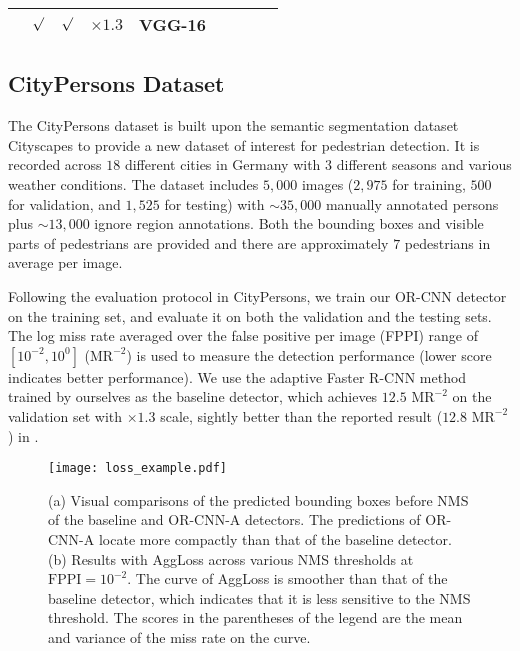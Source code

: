 \documentclass[runningheads]{llncs}
\begin{document}
\begin{table*}[t]
\begin{tabular}{c|cc|c|c|c|ccc}
&$\surd$ &$\surd$  &$\times1.3$ &VGG-16 &\color{red}{11.0} &\color{red}{51.3} &\color{red}{13.7} &\color{red}{5.9} \\
\bottomrule[1.5pt]
\end{tabular}
\label{tab:cityperson-val}
\end{table*}


\subsection{CityPersons Dataset}
The CityPersons dataset \cite{DBLP:conf/cvpr/ZhangBS17} is built upon the semantic segmentation dataset Cityscapes \cite{DBLP:conf/cvpr/CordtsORREBFRS16} to provide a new dataset of interest for pedestrian detection. It is recorded across $18$ different cities in Germany with $3$ different seasons and various weather conditions. The dataset includes $5,000$ images ($2,975$ for training, $500$ for validation, and $1,525$ for testing) with $\sim35,000$ manually annotated persons plus $\sim13,000$ ignore region annotations. Both the bounding boxes and visible parts of pedestrians are provided and there are approximately $7$ pedestrians in average per image.

Following the evaluation protocol in CityPersons, we train our OR-CNN detector on the training set, and evaluate it on both the validation and the testing sets. The log miss rate averaged over the false positive per image (FPPI) range of $[10^{-2}, 10^0]$ ($\text{MR}^{-2}$) is used to measure the detection performance (lower score indicates better performance). We use the adaptive Faster R-CNN method \cite{DBLP:conf/cvpr/ZhangBS17} trained by ourselves as the baseline detector, which achieves $12.5$ $\text{MR}^{-2}$ on the validation set with $\times1.3$ scale, sightly better than the reported result ($12.8$ $\text{MR}^{-2}$) in \cite{DBLP:conf/cvpr/ZhangBS17}.


\begin{figure*}[t]
\centering
\texttt{[image: loss\_example.pdf]}
\caption{(a) Visual comparisons of the predicted bounding boxes before NMS of the baseline and OR-CNN-A detectors. The predictions of OR-CNN-A locate more compactly than that of the baseline detector. (b) Results with AggLoss across various NMS thresholds at $\text{FPPI}=10^{-2}$. The curve of AggLoss is smoother than that of the baseline detector, which indicates that it is less sensitive to the NMS threshold. The scores in the parentheses of the legend are the mean and variance of the miss rate on the curve.}
\label{fig:loss_example}
\end{figure*}
\end{document}
